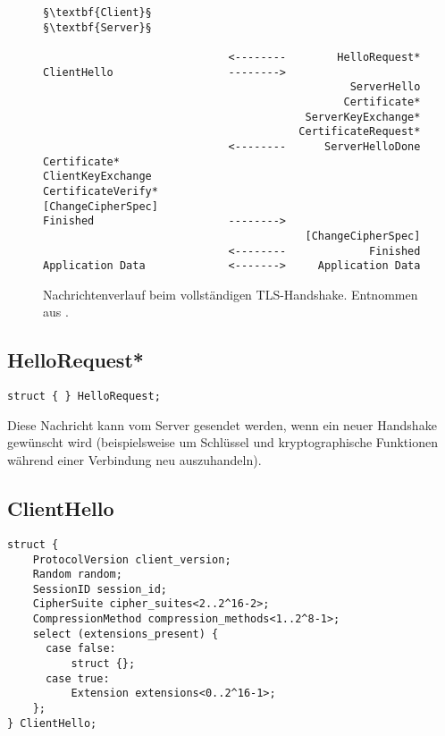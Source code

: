 \lstset{
	style=default,
	frame=single
}
\begin{figure}[H]
	\centering
	\begin{lstlisting}
§\textbf{Client}§                                               §\textbf{Server}§

                             <--------        HelloRequest*
ClientHello                  -------->
                                                ServerHello
                                               Certificate*
                                         ServerKeyExchange*
                                        CertificateRequest*
                             <--------      ServerHelloDone
Certificate*
ClientKeyExchange
CertificateVerify*
[ChangeCipherSpec]
Finished                     -------->
                                         [ChangeCipherSpec]
                             <--------             Finished
Application Data             <------->     Application Data
	\end{lstlisting}
	\caption{Nachrichtenverlauf beim vollständigen TLS-Handshake. Entnommen aus \cite{tls12}.}
	\label{fig_complete_handshake}
\end{figure}
\lstset{style=tls}

\subsection*{HelloRequest*}

\begin{lstlisting}
struct { } HelloRequest;
\end{lstlisting}

Diese Nachricht kann vom Server gesendet werden, wenn ein neuer Handshake gewünscht wird (beispielsweise um Schlüssel und kryptographische Funktionen während einer Verbindung neu auszuhandeln).

\subsection*{ClientHello}

\begin{lstlisting}
struct {
	ProtocolVersion client_version;
	Random random;
	SessionID session_id;
	CipherSuite cipher_suites<2..2^16-2>;
	CompressionMethod compression_methods<1..2^8-1>;
	select (extensions_present) {
	  case false:
	      struct {};
	  case true:
	      Extension extensions<0..2^16-1>;
	};
} ClientHello;
\end{lstlisting}


